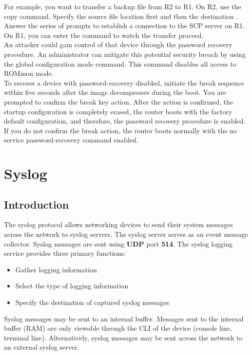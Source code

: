 For example, you want to transfer a backup file from R2 to R1. On R2, use the copy command. Specify the source file location first  and then the destination . Answer the series of prompts to establish a connection to the SCP server on R1. On R1, you can enter the  command to watch the transfer proceed.\\

An attacker could gain control of that device through the password recovery procedure. An administrator can mitigate this potential security breach by using the  global configuration mode command. This command disables all access to ROMmon mode. \\

To recover a device with password-recovery disabled, initiate the break sequence within five seconds after the image decompresses during the boot. You are prompted to confirm the break key action. After the action is confirmed, the startup configuration is completely erased, the router boots with the factory default configuration, and therefore, the password recovery procedure is enabled. If you do not confirm the break action, the router boots normally with the no service password-recovery command enabled.

\section{Syslog}

\subsection{Introduction}

The syslog protocol allows networking devices to send their system messages across the network to syslog servers. The syslog server serves as an event message collector. Syslog messages are sent using \textbf{UDP} port \textbf{514}. The syslog logging service provides three primary functions:

\begin{itemize}
\item Gather logging information
\item Select the type of logging information
\item Specify the destination of captured syslog messages
\end{itemize}

Syslog messages may be sent to an internal buffer. Messages sent to the internal buffer (RAM) are only viewable through the CLI of the device (console line, terminal line). Alternatively, syslog messages may be sent across the network to an external syslog server.\\

